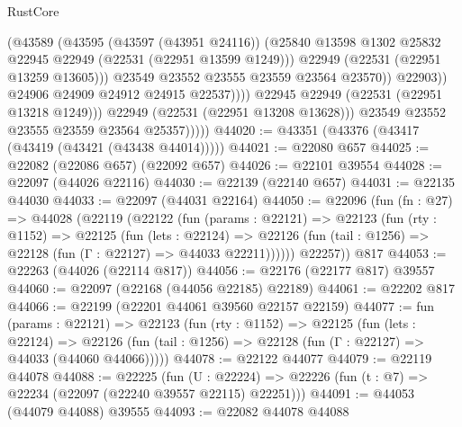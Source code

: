 \begin{lexlean}{RustCore}
\begin{coremodule}
                                (@43589
                                  (@43595
                                    (@43597 (@43951 @24116))
                                    (@25840
                                      @13598
                                      @1302
                                      @25832
                                      @22945
                                      @22949
                                      (@22531 (@22951 @13599 @1249)))
                                    @22949
                                    (@22531 (@22951 @13259 @13605)))
                                  @23549
                                  @23552
                                  @23555
                                  @23559
                                  @23564
                                  @23570))
                              @22903))
                          @24906
                          @24909
                          @24912
                          @24915
                          @22537))))
                  @22945
                  @22949
                  (@22531 (@22951 @13218 @1249)))
                @22949
                (@22531 (@22951 @13208 @13628)))
              @23549
              @23552
              @23555
              @23559
              @23564
              @25357)))))
@44020 := @43351 (@43376 (@43417 (@43419 (@43421 (@43438 @44014)))))
@44021 := @22080 @657
@44025 := @22082 (@22086 @657) (@22092 @657)
@44026 := @22101 @39554
@44028 := @22097 (@44026 @22116)
@44030 := @22139 (@22140 @657)
@44031 := @22135 @44030
@44033 := @22097 (@44031 @22164)
@44050 := @22096
    (fun (fn : @27) =>
    @44028
      (@22119
        (@22122
          (fun (params : @22121) =>
          @22123
            (fun (rty : @1152) =>
            @22125
              (fun (lets : @22124) =>
              @22126 (fun (tail : @1256) => @22128 (fun (Γ : @22127) => @44033 @22211))))))
        @22257))
    @817
@44053 := @22263 (@44026 (@22114 @817))
@44056 := @22176 (@22177 @817) @39557
@44060 := @22097 (@22168 (@44056 @22185) @22189)
@44061 := @22202 @817
@44066 := @22199 (@22201 @44061 @39560 @22157 @22159)
@44077 := fun (params : @22121) =>
  @22123
    (fun (rty : @1152) =>
    @22125
      (fun (lets : @22124) =>
      @22126 (fun (tail : @1256) => @22128 (fun (Γ : @22127) => @44033 (@44060 @44066)))))
@44078 := @22122 @44077
@44079 := @22119 @44078
@44088 := @22225
    (fun (U : @22224) => @22226 (fun (t : @7) => @22234 (@22097 (@22240 @39557 @22115) @22251)))
@44091 := @44053 (@44079 @44088) @39555
@44093 := @22082 @44078 @44088

\end{coremodule}
\end{lexlean}
